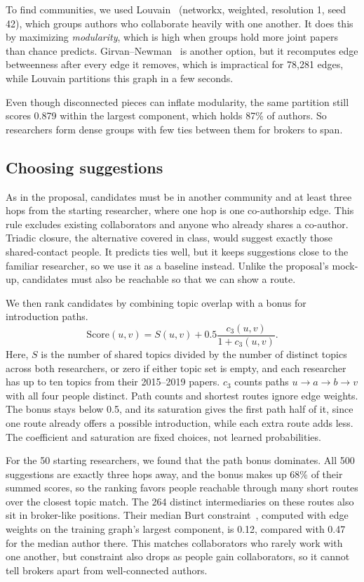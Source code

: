 \documentclass[10pt,twocolumn,letterpaper]{article}
\begin{document}
To find communities, we used Louvain~\cite{blondel2008} (networkx, weighted, resolution 1, seed 42), which groups authors who collaborate heavily with one another. It does this by maximizing \emph{modularity}, which is high when groups hold more joint papers than chance predicts. Girvan--Newman~\cite{girvan2002} is another option, but it recomputes edge betweenness after every edge it removes, which is impractical for 78,281 edges, while Louvain partitions this graph in a few seconds.

Even though disconnected pieces can inflate modularity, the same partition still scores 0.879 within the largest component, which holds 87\% of authors. So researchers form dense groups with few ties between them for brokers to span.

\subsection{Choosing suggestions}
As in the proposal, candidates must be in another community and at least three hops from the starting researcher, where one hop is one co-authorship edge. This rule excludes existing collaborators and anyone who already shares a co-author. Triadic closure, the alternative covered in class, would suggest exactly those shared-contact people. It predicts ties well, but it keeps suggestions close to the familiar researcher, so we use it as a baseline instead. Unlike the proposal's mock-up, candidates must also be reachable so that we can show a route.

We then rank candidates by combining topic overlap with a bonus for introduction paths.
\begin{equation}
\mathrm{Score}(u,v)=S(u,v)+0.5\frac{c_3(u,v)}{1+c_3(u,v)}.
\end{equation}
Here, $S$ is the number of shared topics divided by the number of distinct topics across both researchers, or zero if either topic set is empty, and each researcher has up to ten topics from their 2015--2019 papers. $c_3$ counts paths $u\to a\to b\to v$ with all four people distinct. Path counts and shortest routes ignore edge weights. The bonus stays below 0.5, and its saturation gives the first path half of it, since one route already offers a possible introduction, while each extra route adds less. The coefficient and saturation are fixed choices, not learned probabilities.

For the 50 starting researchers, we found that the path bonus dominates. All 500 suggestions are exactly three hops away, and the bonus makes up 68\% of their summed scores, so the ranking favors people reachable through many short routes over the closest topic match. The 264 distinct intermediaries on these routes also sit in broker-like positions. Their median Burt constraint~\cite{burt1992}, computed with edge weights on the training graph's largest component, is 0.12, compared with 0.47 for the median author there. This matches collaborators who rarely work with one another, but constraint also drops as people gain collaborators, so it cannot tell brokers apart from well-connected authors.
\end{document}
